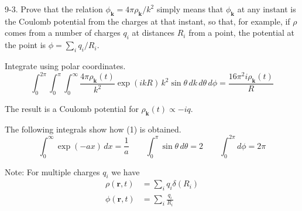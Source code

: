 \documentclass[12pt]{article}
\begin{document}
9-3.
Prove that the relation $\phi_{\mathbf k}=4\pi\rho_{\mathbf k}/k^2$
simply means that $\phi_{\mathbf k}$ at any instant is the Coulomb
potential from the charges at that instant, so that, for example,
if $\rho$ comes from a number of charges $q_i$ at distances $R_i$
from a point, the potential at the point is
$\phi=\sum_iq_i/R_i$.

\bigskip
Integrate using polar coordinates.
\begin{equation*}
\int_0^{2\pi}\int_0^\pi\int_0^\infty
\frac{4\pi\rho_{\mathbf k}(t)}{k^2}\exp(ikR)\,k^2\sin\theta\,dk\,d\theta\,d\phi
=\frac{16\pi^2i\rho_{\mathbf k}(t)}{R}
\tag{1}
\end{equation*}

The result is a Coulomb potential for
$\rho_{\mathbf k}(t)\propto -iq$.

\bigskip
The following integrals show how (1) is obtained.
\begin{equation*}
\int_0^\infty\exp(-a x)\,dx=\frac{1}{a}
\qquad
\int_0^\pi\sin\theta\,d\theta=2
\qquad
\int_0^{2\pi}d\phi=2\pi
\end{equation*}

Note: For multiple charges $q_i$ we have
\begin{align*}
\rho(\mathbf r,t)&=\sum_iq_i\delta(R_i)
\\
\phi(\mathbf r,t)&=\sum_i\frac{q_i}{R_i}
\end{align*}
\end{document}
